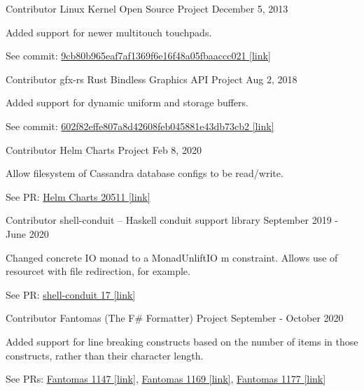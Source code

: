 
\begin{cventries}

  \cventry
  {Contributor}
  {Linux Kernel Open Source Project}
  {}
  {December 5, 2013}
  {
    \begin{cvitems}
      \item{Added support for newer multitouch touchpads.}
      \item{See commit: \href{https://kernel.googlesource.com/pub/scm/linux/kernel/git/clk/linux/+/9cb80b965eaf7af1369f6e16f48a05fbaaccc021}{9cb80b965eaf7af1369f6e16f48a05fbaaccc021 [link]}}
    \end{cvitems}
  }

  \cventry
  {Contributor}
  {gfx-rs Rust Bindless Graphics API Project}
  {}
  {Aug 2, 2018}
  {
    \begin{cvitems}
    \item{Added support for dynamic uniform and storage buffers.}
    \item{See commit: \href{https://github.com/gfx-rs/gfx/commit/602f82effe807a8d42608feb045881e43db73cb2}{602f82effe807a8d42608feb045881e43db73cb2 [link]}}
    \end{cvitems}
  }

  \cventry
  {Contributor}
  {Helm Charts Project}
  {}
  {Feb 8, 2020}
  {
    \begin{cvitems}
      \item{Allow filesystem of Cassandra database configs to be read/write.}
      \item{See PR: \href{https://github.com/helm/charts/pull/20511}{Helm Charts 20511 [link]}}
    \end{cvitems}
  }

  \cventry
  {Contributor}
  {shell-conduit -- Haskell conduit support library}
  {}
  {September 2019 - June 2020}
  {
    \begin{cvitems}
      \item{Changed concrete IO monad to a MonadUnliftIO m constraint.  Allows use of resourcet with file redirection, for example.}
      \item{See PR: \href{https://github.com/psibi/shell-conduit/pull/17}{shell-conduit 17 [link]}}
    \end{cvitems}
  } 

  \cventry
  {Contributor}
  {Fantomas (The F\# Formatter) Project}
  {}
  {September - October 2020}
  {
    \begin{cvitems}
      \item{Added support for line breaking constructs based on the number of items in those constructs, rather than their character length.}
      \item{See PRs: \href{https://github.com/fsprojects/fantomas/pull/1147}{Fantomas 1147 [link]}, \href{https://github.com/fsprojects/fantomas/pull/1169}{Fantomas 1169 [link]}, \href{https://github.com/fsprojects/fantomas/pull/1177}{Fantomas 1177 [link]}}
    \end{cvitems}
  }

  
\end{cventries}
    
